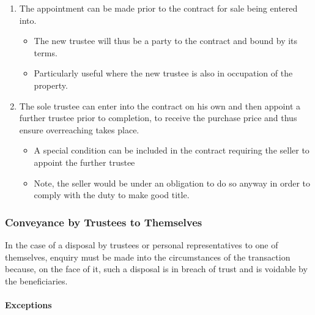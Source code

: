 \documentclass[
]{article}
\newenvironment{Shaded}{}{}
\newcommand{\NormalTok}[1]{#1}
\providecommand{\tightlist}{%
  \setlength{\itemsep}{0pt}\setlength{\parskip}{0pt}}
\begin{document}
\begin{enumerate}
\def\labelenumi{\arabic{enumi}.}
\tightlist
\item
  The appointment can be made prior to the contract for sale being
  entered into.

  \begin{itemize}
  \tightlist
  \item
    The new trustee will thus be a party to the contract and bound by
    its terms.
  \item
    Particularly useful where the new trustee is also in occupation of
    the property.
  \end{itemize}
\item
  The sole trustee can enter into the contract on his own and then
  appoint a further trustee prior to completion, to receive the purchase
  price and thus ensure overreaching takes place.

  \begin{itemize}
  \tightlist
  \item
    A special condition can be included in the contract requiring the
    seller to appoint the further trustee
  \item
    Note, the seller would be under an obligation to do so anyway in
    order to comply with the duty to make good title.
  \end{itemize}
\end{enumerate}

\hypertarget{conveyance-by-trustees-to-themselves}{%
\subsubsection{Conveyance by Trustees to
Themselves}\label{conveyance-by-trustees-to-themselves}}

\begin{Shaded}
\begin{Highlighting}[]
\NormalTok{In the case of a disposal by trustees or personal representatives to one of themselves, enquiry must be made into the circumstances of the transaction because, on the face of it, such a disposal is in breach of trust and is voidable by the beneficiaries.}
\end{Highlighting}
\end{Shaded}

\hypertarget{exceptions}{%
\paragraph{Exceptions}\label{exceptions}}
\end{document}
